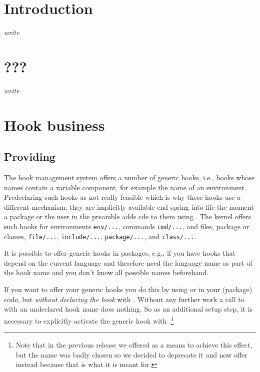 \documentclass{ltnews}
\providecommand\tubcommand[1]{}
\begin{document}
\tubcommand{\addtolength\textheight{4.2pc}}   %

\maketitle
{ \spaceskip=3.33pt  \tableofcontents}

\setlength{}


\medskip


\section{Introduction}

\emph{write}

\section{???}

\emph{write}




\section{Hook business}


\subsection{Providing }

The hook management system offers a number of generic hooks, i.e.,
hooks whose names contain a variable component, for example the name
of an environment. Predeclaring such hooks as not really feasible
which is why these hooks use a different mechanism: they are
implicitly available end spring into life the moment a package or the
user in the preamble adds cde to them using .  The
kernel offers such hooks for environments \texttt{env/...}, commands
\texttt{cmd/...}, and files, package or classes, \texttt{file/...},
\texttt{include/...}, \texttt{package/...}, and \texttt{class/...}.

It is possible to offer generic hooks in packages, e.g., if you have
hooks that depend on the current language and therefore need the
language name as part of the hook name and you don't know all possible
names beforehand.

If you want to offer your generic hooks you do this by using
 or  in your (package) code, but
\emph{without declaring the hook} with . Without any
further work a call to  with an undeclared hook name does
nothing. So as an additional setup step, it is necessary to explicitly
activate the generic hook with .\footnote{Note
  that in the previous release we offered  as a means
  to achieve this effect, but the name was badly chosen so we decided
  to deprecate it and now offer  instead
  because that is what it is meant for.}
\end{document}
